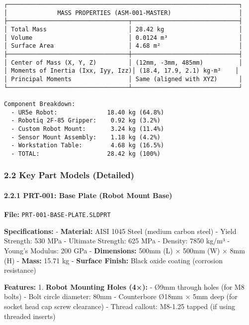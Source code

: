 \documentclass[
]{article}
\begin{document}
\begin{verbatim}
┌─────────────────────────────────────────────────────────────────┐
│              MASS PROPERTIES (ASM-001-MASTER)                   │
├──────────────────────────────────┬──────────────────────────────┤
│ Total Mass                       │ 28.42 kg                     │
│ Volume                           │ 0.0124 m³                    │
│ Surface Area                     │ 4.68 m²                      │
├──────────────────────────────────┼──────────────────────────────┤
│ Center of Mass (X, Y, Z)         │ (12mm, -3mm, 485mm)          │
│ Moments of Inertia (Ixx, Iyy, Izz)│ (18.4, 17.9, 2.1) kg·m²    │
│ Principal Moments                │ Same (aligned with XYZ)      │
└──────────────────────────────────┴──────────────────────────────┘

Component Breakdown:
  - UR5e Robot:              18.40 kg (64.8%)
  - Robotiq 2F-85 Gripper:    0.92 kg (3.2%)
  - Custom Robot Mount:       3.24 kg (11.4%)
  - Sensor Mount Assembly:    1.18 kg (4.2%)
  - Workstation Table:        4.68 kg (16.5%)
  - TOTAL:                   28.42 kg (100%)
\end{verbatim}

\hypertarget{key-part-models-detailed}{%
\subsubsection{2.2 Key Part Models
(Detailed)}\label{key-part-models-detailed}}

\hypertarget{prt-001-base-plate-robot-mount-base}{%
\paragraph{2.2.1 PRT-001: Base Plate (Robot Mount
Base)}\label{prt-001-base-plate-robot-mount-base}}

\textbf{File:} \texttt{PRT-001-BASE-PLATE.SLDPRT}

\textbf{Specifications:} - \textbf{Material:} AISI 1045 Steel (medium
carbon steel) - Yield Strength: 530 MPa - Ultimate Strength: 625 MPa -
Density: 7850 kg/m³ - Young's Modulus: 200 GPa - \textbf{Dimensions:}
500mm (L) × 500mm (W) × 8mm (H) - \textbf{Mass:} 15.71 kg -
\textbf{Surface Finish:} Black oxide coating (corrosion resistance)

\textbf{Features:} 1. \textbf{Robot Mounting Holes (4×):} - Ø9mm through
holes (for M8 bolts) - Bolt circle diameter: 80mm - Counterbore Ø18mm ×
5mm deep (for socket head cap screw clearance) - Thread callout: M8-1.25
tapped (if using threaded inserts)
\end{document}
